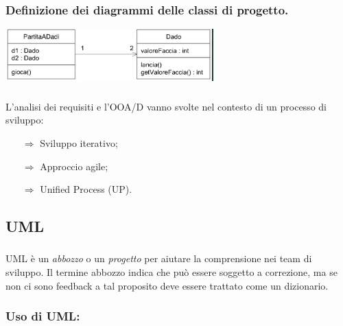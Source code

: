 {\subsubsection{Definizione dei diagrammi delle classi di progetto.}

\begin{center}
    \includegraphics[scale=0.7]{images/Dadi 3.png}
\end{center}

}
\subsubsection{}
L'analisi dei requisiti e l'OOA/D vanno svolte nel contesto di un processo di sviluppo:

\begin{itemize}
    \item [$\Rightarrow$] Sviluppo iterativo;
    \item [$\Rightarrow$] Approccio agile;
    \item [$\Rightarrow$] Unified Process (UP).
\end{itemize}

\pagebreak

\subsection{UML}

\subsubsection{}
UML è un \textit{abbozzo} o un \textit{progetto} per aiutare la comprensione nei team di sviluppo.
Il termine abbozzo indica che può essere soggetto a correzione, ma se non ci 
sono feedback a tal proposito deve essere trattato come un dizionario.

\subsubsection{Uso di UML:}

